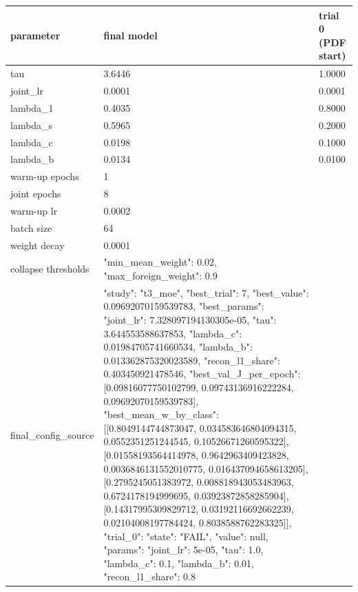 \begin{tabular}{lll}
\hline
parameter & final model & trial 0 (PDF start) \\
\hline
tau & 3.6446 & 1.0000 \\
joint\_lr & 0.0001 & 0.0001 \\
lambda\_1 & 0.4035 & 0.8000 \\
lambda\_s & 0.5965 & 0.2000 \\
lambda\_c & 0.0198 & 0.1000 \\
lambda\_b & 0.0134 & 0.0100 \\
warm-up epochs & 1 &  \\
joint epochs & 8 &  \\
warm-up lr & 0.0002 &  \\
batch size & 64 &  \\
weight decay & 0.0001 &  \\
collapse thresholds & {"min\_mean\_weight": 0.02, "max\_foreign\_weight": 0.9} &  \\
final\_config\_source & {"study": "t3\_moe", "best\_trial": 7, "best\_value": 0.09692070159539783, "best\_params": {"joint\_lr": 7.328097194130305e-05, "tau": 3.644553588637853, "lambda\_c": 0.01984705741660534, "lambda\_b": 0.013362875320023589, "recon\_l1\_share": 0.403450921478546}, "best\_val\_J\_per\_epoch": [0.09816077750102799, 0.09743136916222284, 0.09692070159539783], "best\_mean\_w\_by\_class": [[0.8049144744873047, 0.034583646804094315, 0.0552351251244545, 0.10526671260595322], [0.01558193564414978, 0.9642963409423828, 0.0036846131552010775, 0.016437094658613205], [0.2795245051383972, 0.008818943053483963, 0.6724178194999695, 0.03923872858285904], [0.14317995309829712, 0.03192116692662239, 0.02104008197784424, 0.8038588762283325]], "trial\_0": {"state": "FAIL", "value": null, "params": {"joint\_lr": 5e-05, "tau": 1.0, "lambda\_c": 0.1, "lambda\_b": 0.01, "recon\_l1\_share": 0.8}}} &  \\
\hline
\end{tabular}
